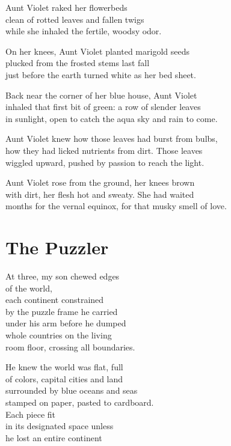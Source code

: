 \documentclass[twoside,10pt]{book}
\begin{document}
Aunt Violet raked her flowerbeds\\
clean of rotted leaves and fallen twigs\\
while she inhaled the fertile, woodsy odor.

On her knees, Aunt Violet planted marigold seeds\\
plucked from the frosted stems last fall\\
just before the earth turned white as her bed sheet.

Back near the corner of her blue house, Aunt Violet\\
inhaled that first bit of green: a row of slender leaves\\
in sunlight, open to catch the aqua sky and rain to come.

Aunt Violet knew how those leaves had burst from bulbs,\\
how they had licked nutrients from dirt. Those leaves\\
wiggled upward, pushed by passion to reach the light.

Aunt Violet rose from the ground, her knees brown\\
with dirt, her flesh hot and sweaty. She had waited\\
months for the vernal equinox, for that musky smell of love.


\clearpage
\section{The Puzzler}

At three, my son chewed edges\\
of the world,\\
each continent constrained\\
by the puzzle frame he carried\\
under his arm before he dumped\\
whole countries on the living\\
room floor, crossing all boundaries.

He knew the world was flat, full\\
of colors, capital cities and land\\
surrounded by blue oceans and seas\\
stamped on paper, pasted to cardboard.\\
Each piece fit\\
in its designated space unless\\
he lost an entire continent
\end{document}
